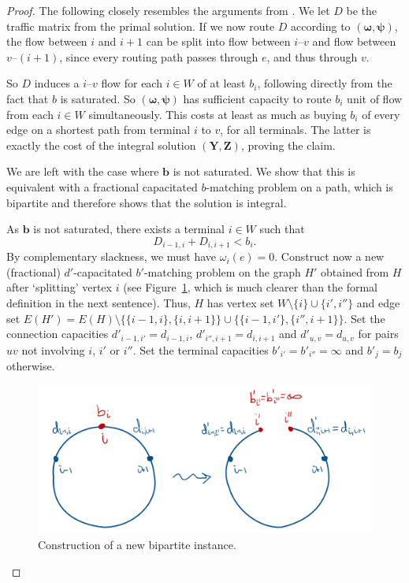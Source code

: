 \begin{proof}
    The following closely resembles the arguments from \cite{bosman2017exploring}.
    We let $D$ be the traffic matrix from the primal solution.
    If we now route $D$ according to $(\boldsymbol \omega, \boldsymbol \psi)$, the flow between $i$ and $i+1$ can be split into flow between $i$--$v$ and flow between $v$--$(i+1)$, since every routing path passes through $e$, and thus through $v$.

    So $D$ induces a $i$--$v$ flow for each $i \in W$ of at least $b_i$, following directly from the fact that $b$ is saturated.
    So $(\boldsymbol \omega, \boldsymbol \psi)$ has sufficient capacity to route $b_i$ unit of flow from each $i \in W$ simultaneously.
    This costs at least as much as buying $b_i$ of every edge on a shortest path from terminal $i$ to $v$, for all terminals.
    The latter is exactly the cost of the integral solution $(\boldsymbol Y, \boldsymbol Z)$, proving the claim.

    We are left with the case where $\boldsymbol b$ is not saturated.
    We show that this is equivalent with a fractional capacitated $b$-matching problem on a path, which is bipartite and therefore shows that the solution is integral.

    As $\boldsymbol b$ is not saturated, there exists a terminal $i \in W$ such that
    \[
        D_{i-1,i} + D_{i,i+1} < b_i.
    \]
    By complementary slackness, we must have $\omega_i(e) = 0$.
    Construct now a new (fractional) $d'$-capacitated $b'$-matching problem on the graph $H'$ obtained from $H$ after `splitting' vertex $i$ (see Figure~\ref{fig:split}, which is much clearer than the formal definition in the next sentence).
    Thus, $H$ has vertex set $W\setminus \{i\} \cup \{i', i''\}$ and edge set $E(H') = E(H) \setminus \{ \{i-1,i\}, \{i, i+1\} \} \cup \{ \{i-1, i'\}, \{i'', i+1\} \}$.
    Set the connection capacities $d'_{i-1,i'} = d_{i-1,i}$, $d'_{i'',i+1} = d_{i,i+1}$ and $d'_{u,v} = d_{u,v}$ for pairs $uv$ not involving $i$, $i'$ or $i''$.
    Set the terminal capacities $b'_{i'} = b'_{i''} = \infty$ and $b'_j = b_j$ otherwise.

    \begin{figure}
        \centering
        \includegraphics[width=.65\textwidth]{split}
        \caption{Construction of a new bipartite instance.} \label{fig:split}
    \end{figure}


\end{proof}

